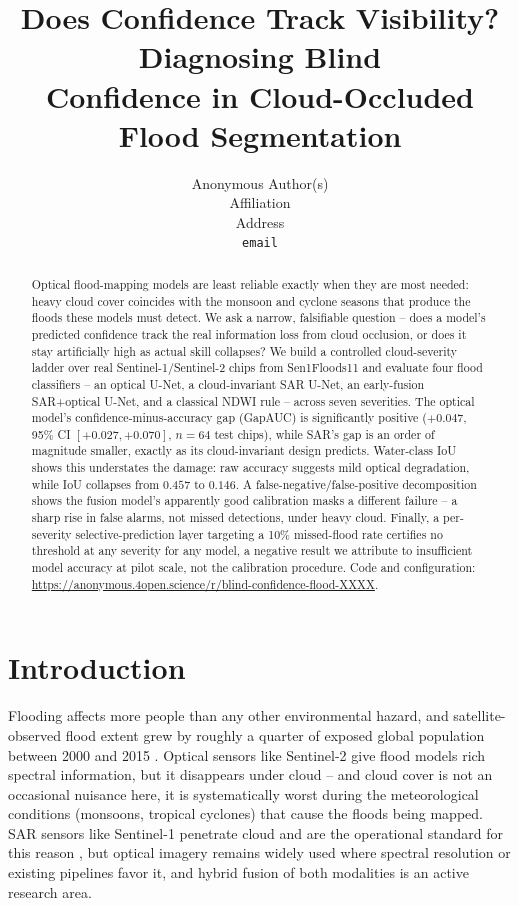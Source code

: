 \documentclass{article}
\title{Does Confidence Track Visibility? Diagnosing Blind \\
Confidence in Cloud-Occluded Flood Segmentation}
\author{
  Anonymous Author(s) \\
  Affiliation \\
  Address \\
  \texttt{email}
}
\begin{document}
\maketitle

\begin{abstract}
Optical flood-mapping models are least reliable exactly when they are most needed: heavy cloud cover coincides with the monsoon and cyclone seasons that produce the floods these models must detect. We ask a narrow, falsifiable question -- does a model's predicted confidence track the real information loss from cloud occlusion, or does it stay artificially high as actual skill collapses? We build a controlled cloud-severity ladder over real Sentinel-1/Sentinel-2 chips from Sen1Floods11 and evaluate four flood classifiers -- an optical U-Net, a cloud-invariant SAR U-Net, an early-fusion SAR+optical U-Net, and a classical NDWI rule -- across seven severities. The optical model's confidence-minus-accuracy gap (GapAUC) is significantly positive ($+0.047$, 95\% CI $[+0.027,+0.070]$, $n=64$ test chips), while SAR's gap is an order of magnitude smaller, exactly as its cloud-invariant design predicts. Water-class IoU shows this understates the damage: raw accuracy suggests mild optical degradation, while IoU collapses from $0.457$ to $0.146$. A false-negative/false-positive decomposition shows the fusion model's apparently good calibration masks a different failure -- a sharp rise in false alarms, not missed detections, under heavy cloud. Finally, a per-severity selective-prediction layer targeting a 10\% missed-flood rate certifies no threshold at any severity for any model, a negative result we attribute to insufficient model accuracy at pilot scale, not the calibration procedure. Code and configuration: \url{https://anonymous.4open.science/r/blind-confidence-flood-XXXX}.
\end{abstract}

\section{Introduction}
\label{sec:intro}

Flooding affects more people than any other environmental hazard, and satellite-observed flood extent grew by roughly a quarter of exposed global population between 2000 and 2015 \citep{tellman2021satellite}. Optical sensors like Sentinel-2 give flood models rich spectral information, but it disappears under cloud -- and cloud cover is not an occasional nuisance here, it is systematically worst during the meteorological conditions (monsoons, tropical cyclones) that cause the floods being mapped. SAR sensors like Sentinel-1 penetrate cloud and are the operational standard for this reason \citep{misra2025mapping}, but optical imagery remains widely used where spectral resolution or existing pipelines favor it, and hybrid fusion of both modalities is an active research area.
\end{document}

